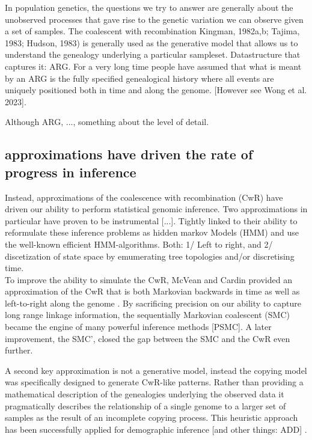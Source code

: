 \documentclass{article}
\begin{document}
In population genetics, the questions we try to answer are generally 
about the unobserved processes that gave rise to the genetic variation 
we can observe given a set of samples. 
The coalescent with recombination 
Kingman, 1982a,b; Tajima, 1983; Hudson, 1983) is generally used as 
the generative model that allows us to understand the genealogy 
underlying a particular sampleset. 
Datastructure that captures it: ARG.
For a very long time people have assumed that what is meant by an ARG is the 
fully specified genealogical history  
where all events are uniquely positioned both in time
and along the genome. [However see Wong et al. 2023]. 

Although ARG, ...,
something about the level of detail.

\subsection{approximations have driven the rate of progress in inference}

Instead, approximations of the coalescence with recombination (CwR) have  
driven our ability to perform statistical genomic inference. Two approximations 
in particular have proven to be instrumental [...]. Tightly linked to their 
ability to reformulate these inference problems as hidden markov Models (HMM) 
and use the well-known efficient HMM-algorithms. 
Both: 1/ Left to right, and 2/ discetization 
of state space by emumerating tree topologies and/or discretising time.\\

To improve the ability to simulate the CwR, McVean and Cardin 
provided an approximation of the CwR that is both Markovian backwards in time 
as well as left-to-right along the genome \citep{mcvean_2005_approximating}. 
By sacrificing precision on our ability to capture long range linkage 
information, the sequentially Markovian coalescent (SMC) 
became the engine of many powerful inference methods [PSMC]. 
A later improvement, the SMC', closed the gap between the SMC and the 
CwR even further.

A second key approximation is not a generative model, instead the 
copying model \citep{li_2003_modeling} was specifically designed to 
generate CwR-like patterns. 
Rather than providing a mathematical description of the genealogies 
underlying the observed data it pragmatically describes the relationship 
of a single genome to a larger set of samples as the result of an 
incomplete copying process. This heuristic approach has been successfully 
applied for demographic inference [and other things: ADD] 
\citep{sheehan_2013_estimating, steinrucken_2018}.
\end{document}
